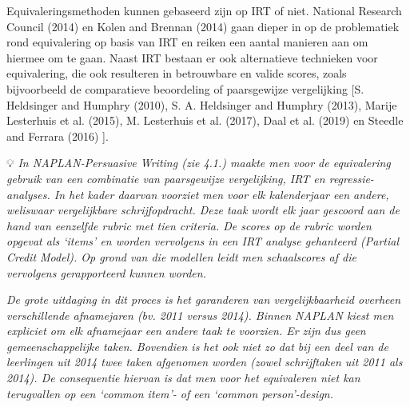 \documentclass[
  letterpaper,
]{report}
\begin{document}
Equivaleringsmethoden kunnen gebaseerd zijn op IRT of niet. National
Research Council (2014) en Kolen and Brennan (2014) gaan dieper in op de
problematiek rond equivalering op basis van IRT en reiken een aantal
manieren aan om hiermee om te gaan. Naast IRT bestaan er ook
alternatieve technieken voor equivalering, die ook resulteren in
betrouwbare en valide scores, zoals bijvoorbeeld de comparatieve
beoordeling of paarsgewijze vergelijking {[}S. Heldsinger and Humphry
(2010), S. A. Heldsinger and Humphry (2013), Marije Lesterhuis et al.
(2015), M. Lesterhuis et al. (2017), Daal et al. (2019) en Steedle and
Ferrara (2016) {]}.

💡 \emph{In NAPLAN-Persuasive Writing (zie 4.1.) maakte men voor de
equivalering gebruik van een combinatie van paarsgewijze vergelijking,
IRT en regressie-analyses. In het kader daarvan voorziet men voor elk
kalenderjaar een andere, weliswaar vergelijkbare schrijfopdracht. Deze
taak wordt elk jaar gescoord aan de hand van eenzelfde rubric met tien
criteria. De scores op de rubric worden opgevat als `items' en worden
vervolgens in een IRT analyse gehanteerd (Partial Credit Model). Op
grond van die modellen leidt men schaalscores af die vervolgens
gerapporteerd kunnen worden.}

\emph{De grote uitdaging in dit proces is het garanderen van
vergelijkbaarheid overheen verschillende afnamejaren (bv. 2011 versus
2014). Binnen NAPLAN kiest men expliciet om elk afnamejaar een andere
taak te voorzien. Er zijn dus geen gemeenschappelijke taken. Bovendien
is het ook niet zo dat bij een deel van de leerlingen uit 2014 twee
taken afgenomen worden (zowel schrijftaken uit 2011 als 2014). De
consequentie hiervan is dat men voor het equivaleren niet kan
terugvallen op een `common item'- of een `common person'-design.}
\end{document}
